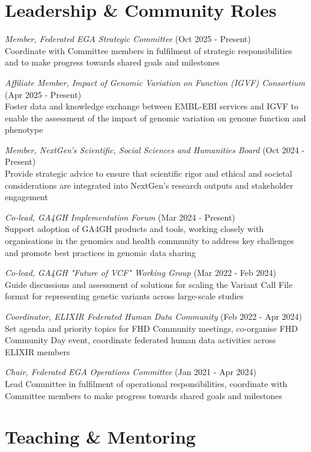 \documentclass[margin,line]{res}
\begin{document}
\begin{resume}
\section{\sc Leadership \& Community Roles}

{\em Member, Federated EGA Strategic Committee} (Oct 2025 - Present)\\
Coordinate with Committee members in fulfilment of strategic responsibilities and to make progress towards shared goals and milestones

{\em Affiliate Member, Impact of Genomic Variation on Function (IGVF) Consortium} (Apr 2025 - Present)\\
Foster data and knowledge exchange between EMBL-EBI services and IGVF to enable the assessment of the impact of genomic variation on genome function and phenotype

{\em Member, NextGen's Scientific, Social Sciences and Humanities Board} (Oct 2024 - Present)\\
Provide strategic advice to ensure that scientific rigor and ethical and societal considerations are integrated into NextGen's research outputs and stakeholder engagement

{\em Co-lead, GA4GH Implementation Forum} (Mar 2024 - Present)\\
Support adoption of GA4GH products and tools, working closely with organisations in the genomics and health community to address key challenges and promote best practices in genomic data sharing

{\em Co-lead, GA4GH "Future of VCF" Working Group} (Mar 2022 - Feb 2024)\\
Guide discussions and assessment of solutions for scaling the Variant Call File format for representing genetic variants across large-scale studies

{\em Coordinator, ELIXIR Federated Human Data Community} (Feb 2022 - Apr 2024)\\
Set agenda and priority topics for FHD Community meetings, co-organise FHD Community Day event, coordinate federated human data activities across ELIXIR members

{\em Chair, Federated EGA Operations Committee} (Jan 2021 - Apr 2024)\\
Lead Committee in fulfilment of operational responsibilities, coordinate with Committee members to make progress towards shared goals and milestones

\section{\sc Teaching \& Mentoring}


\end{resume}
\end{document}
